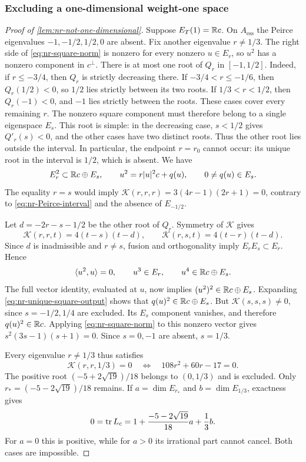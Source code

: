 \subsubsection{Excluding a one-dimensional weight-one space}

\begin{proof}[Proof of \cref{lem:nr-not-one-dimensional}]
Suppose \(E_T(1)=\mathbb R c\). On $A_{\mathrm{ess}}$ the Peirce
eigenvalues \(-1,-1/2,1/2,0\) are absent. Fix another eigenvalue \(r\ne1/3\).
The right side of \eqref{eq:nr-square-norm} is nonzero for every
nonzero \(u\in E_r\), so \(u^2\) has a nonzero component in
\(c^\perp\).
There is at most one root of \(Q_r\) in \([-1,1/2]\).
Indeed, if \(r\le-3/4\), then \(Q_r\) is strictly decreasing
there. If \(-3/4<r\le-1/6\), then \(Q_r(1/2)<0\),
so \(1/2\) lies strictly between its two roots. If
\(1/3<r<1/2\), then \(Q_r(-1)<0\), and \(-1\) lies
strictly between the roots. These cases cover every remaining \(r\).
The nonzero square component must therefore belong to a single
eigenspace \(E_s\). This root is simple: in the decreasing case,
\(s<1/2\) gives \(Q'_r(s)<0\), and the other cases have two
distinct roots. Thus the other root lies outside the interval.
In particular, the endpoint \(r=r_0\)
cannot occur: its unique root in the interval is \(1/2\), which is
absent. We have
\begin{equation}\label{eq:nr-unique-square-output}
 E_r^2\subset\mathbb R c\oplus E_s,\qquad
 u^2=r|u|^2c+q(u),\qquad 0\ne q(u)\in E_s.
\end{equation}
The equality \(r=s\) would imply
\(\mathscr K(r,r,r)=3(4r-1)(2r+1)=0\), contrary to
\eqref{eq:nr-Peirce-interval} and the absence of \(E_{-1/2}\).

Let \(d=-2r-s-1/2\) be the other root of \(Q_r\).
Symmetry of \(\mathscr K\) gives
\[
 \mathscr K(r,r,t)=4(t-s)(t-d),\qquad
 \mathscr K(r,s,t)=4(t-r)(t-d).
\]
Since \(d\) is inadmissible and \(r\ne s\), fusion and
orthogonality imply \(E_rE_s\subset E_r\). Hence
\[
 \langle u^2,u\rangle=0,\qquad u^3\in E_r,\qquad
 u^4\in\mathbb R c\oplus E_s.
\]
The full vector identity, evaluated at \(u\), now implies
\((u^2)^2\in\mathbb R c\oplus E_s\).
Expanding \eqref{eq:nr-unique-square-output} shows that
\(q(u)^2\in\mathbb R c\oplus E_s\).
But \(\mathscr K(s,s,s)\ne0\), since \(s=-1/2,1/4\) are
excluded. Its \(E_s\) component vanishes, and therefore
\(q(u)^2\in\mathbb R c\).
Applying \eqref{eq:nr-square-norm} to this nonzero vector gives
\(s^2(3s-1)(s+1)=0\). Since \(s=0,-1\) are absent, \(s=1/3\).

Every eigenvalue \(r\ne1/3\) thus satisfies
\[
 \mathscr K(r,r,1/3)=0
 \quad\Longleftrightarrow\quad 108r^2+60r-17=0.
\]
The positive root \((-5+2\sqrt{19})/18\) belongs to
\((0,1/3)\) and is excluded. Only
\(r_*=(-5-2\sqrt{19})/18\) remains. If
\(a=\dim E_{r_*}\) and \(b=\dim E_{1/3}\), exactness gives
\[
 0=\operatorname{tr} L_c=1+\frac{-5-2\sqrt{19}}{18}a+\frac13b.
\]
For \(a=0\) this is positive, while for \(a>0\) its irrational
part cannot cancel. Both cases are impossible.
\end{proof}

